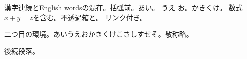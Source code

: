 \documentclass[pdflatex]{jlreq}
\begin{document}
\begin{ptjparagraph}
漢字連続とEnglish wordsの混在。\inhibitglue 括弧前。あ\hspace{3pt}い。
\kern2pt うえ お。か\allowbreak き\allowbreak く\allowbreak け。
数式$x+y=z$を含む。\mbox{不透過箱}と。
\hyperref[par:target]{リンク付き}\label{par:target}。
\end{ptjparagraph}
\begin{ptjparagraph}
二つ目の環境。あいうえおかきくけこさしすせそ。敬称略。
\end{ptjparagraph}
後続段落。
\makeatletter
{}
\makeatother
\end{document}
